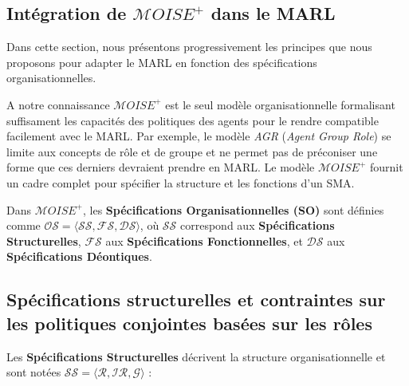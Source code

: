 \documentclass[sigconf,anonymous]{aamas}
\begin{document}
\subsection{Intégration de $\mathcal{M}OISE^+$ dans le MARL}

Dans cette section, nous présentons progressivement les principes que nous proposons pour adapter le MARL en fonction des spécifications organisationnelles.

A notre connaissance $\mathcal{M}OISE^+$ est le seul modèle organisationnelle formalisant suffisament les capacités des politiques des agents pour le rendre compatible facilement avec le MARL. Par exemple, le modèle \textit{AGR} (\textit{Agent Group Role}) se limite aux concepts de rôle et de groupe et ne permet pas de préconiser une forme que ces derniers devraient prendre en MARL. Le modèle $\mathcal{M}OISE^+$ fournit un cadre complet pour spécifier la structure et les fonctions d'un SMA.

Dans $\mathcal{M}OISE^+$, les \textbf{Spécifications Organisationnelles (SO)} sont définies comme $\mathcal{OS} = \langle \mathcal{SS}, \mathcal{FS}, \mathcal{DS} \rangle$, où $\mathcal{SS}$ correspond aux \textbf{Spécifications Structurelles}, $\mathcal{FS}$ aux \textbf{Spécifications Fonctionnelles}, et $\mathcal{DS}$ aux \textbf{Spécifications Déontiques}.

\subsection{Spécifications structurelles et contraintes sur les politiques conjointes basées sur les rôles}

Les \textbf{Spécifications Structurelles} décrivent la structure organisationnelle et sont notées $\mathcal{SS} = \langle \mathcal{R}, \mathcal{IR}, \mathcal{G} \rangle$ :
\end{document}
